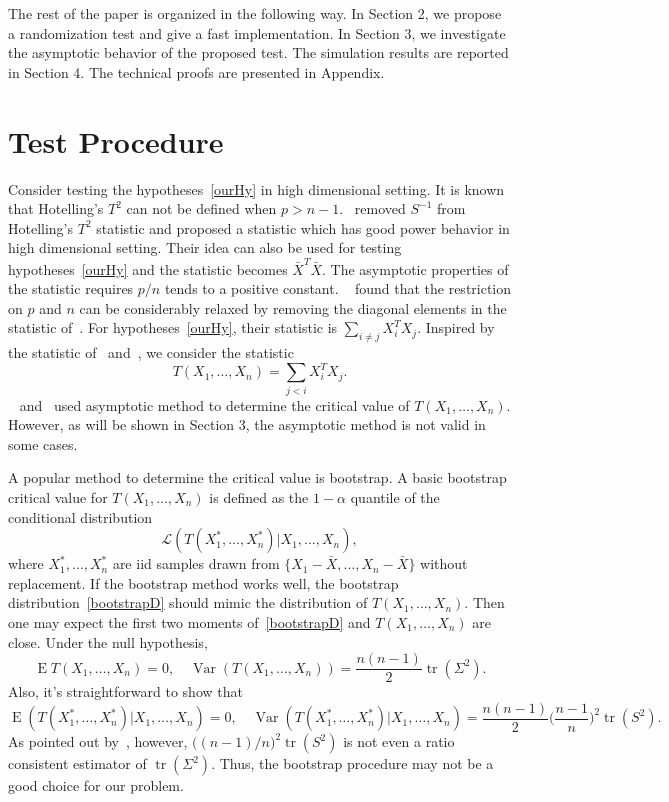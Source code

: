 \documentclass[3p]{elsarticle}
\DeclareMathOperator{\mytr}{tr}
\DeclareMathOperator{\myE}{E}
\DeclareMathOperator{\myVar}{Var}
\theoremstyle{plain}
\theoremstyle{definition}
\theoremstyle{remark}
\begin{document}


The rest of the paper is organized in the following way. In Section 2, we propose a randomization test and give a fast implementation.  In Section 3, we investigate the asymptotic behavior of the proposed test. The simulation results are reported in Section 4. The technical proofs are presented in Appendix.




\section{Test Procedure}
Consider testing the hypotheses~\eqref{ourHy} in high dimensional setting.
It is known that Hotelling's $T^2$ can not be defined when $p> n-1$.~\citet{Bai1996Efiect} removed $S^{-1}$ from Hotelling's $T^2$ statistic and proposed a statistic which has good power behavior in high dimensional setting.
Their idea can also be used for testing hypotheses~\eqref{ourHy} and the statistic becomes $\bar{X}^T \bar{X}$.
The asymptotic properties of the statistic requires $p/n$ tends to a positive constant.
 ~\citet{Chen2010A} found that the restriction on $p$ and $n$ can be considerably relaxed by removing the diagonal elements in the statistic of~\citet{Bai1996Efiect}.
 For hypotheses~\eqref{ourHy}, their statistic is $\sum_{i \neq j}X_i^T X_j$.
 Inspired by the statistic of~\citet{Bai1996Efiect} and~\citet{Chen2010A}, we consider the statistic
\begin{equation}\label{Statistic}
    T(X_1,\ldots,X_n)=\sum_{j<i}X_i^T X_j.
\end{equation}
~\citet{Bai1996Efiect} and~\citet{Chen2010A} used asymptotic method to determine the critical value of $T(X_1,\ldots,X_n)$.
However, as will be shown in Section 3, the asymptotic method is not valid in some cases.

A popular method to determine the critical value is bootstrap.
A basic bootstrap critical value for $T(X_1,\ldots,X_n)$ is defined as the $1-\alpha$ quantile of the conditional distribution
 \begin{equation}\label{bootstrapD}
 \mathcal{L}(T(X_1^*,\ldots,X_n^*)|X_1,\ldots,X_n),
 \end{equation}
        where $X_1^*,\ldots,X_n^*$ are iid samples drawn from $\{X_1-\bar{X},\ldots,X_n-\bar{X}\}$ without replacement.
        If the bootstrap method works well, the bootstrap distribution~\eqref{bootstrapD} should mimic the distribution of $T(X_1,\ldots,X_n)$.
Then one may expect the first two moments of~\eqref{bootstrapD} and $T(X_1,\ldots,X_n)$ are close.
        Under the null hypothesis,
        $$
 \myE T(X_1,\ldots,X_n)=0,
 \quad
 \myVar(T(X_1,\ldots,X_n))=\frac{n(n-1)}{2} \mytr(\Sigma^2).
        $$
Also, it's straightforward to show that
$$
 \myE(T(X_1^*,\ldots,X_n^*)|X_1,\ldots,X_n)=0,
 \quad
 \myVar(T(X_1^*,\ldots,X_n^*)|X_1,\ldots,X_n)=\frac{n(n-1)}{2}\big(\frac{n-1}{n}\big)^2 \mytr(S^2).
$$
As pointed out by~\cite{Bai1996Efiect}, however, $\big((n-1)/{n}\big)^2 \mytr(S^2)$ is not even a ratio consistent estimator of $\mytr(\Sigma^2)$.
Thus, the bootstrap procedure may not be a good choice for our problem.
\end{document}
